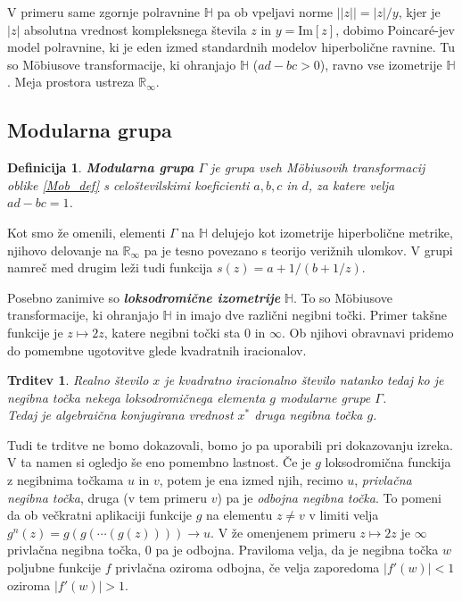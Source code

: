 \documentclass[a4paper,12pt]{article}
\def\R{\mathbb{R}} %
\def\H{\mathbb{H}} %
\newtheorem{trditev}{Trditev}
\newtheorem{definicija}{Definicija}
\begin{document}
V primeru same zgornje polravnine $\H$ pa ob vpeljavi norme $||z|| = |z| / y$, kjer je $|z|$ absolutna vrednost kompleksnega števila $z$ in $y = \text{Im}[z]$, dobimo Poincar\'{e}-jev model polravnine, ki je eden izmed standardnih modelov hiperbolične ravnine. Tu so M\"{o}biusove transformacije, ki ohranjajo $\H$ ($ad - bc > 0$), ravno vse izometrije $\H$. Meja prostora ustreza $\R_{\infty}.$ 

\subsection{Modularna grupa}

\begin{definicija}
    \textbf{Modularna grupa} $\Gamma$ je grupa vseh M\"{o}biusovih transformacij oblike \eqref{Mob_def} s celoštevilskimi koeficienti $a, b, c$ in $d$, za katere velja $ad - bc = 1$.
\end{definicija}

Kot smo že omenili, elementi $\Gamma$ na $\H$ delujejo kot izometrije hiperbolične metrike, njihovo delovanje na $\R_{\infty}$ pa je tesno povezano s teorijo verižnih ulomkov. V grupi namreč med drugim leži tudi funkcija $s(z) = a + 1/(b + 1/z)$.

Posebno zanimive so \textbf{\emph{loksodromične izometrije}} $\H$. To so M\"{o}biusove transformacije, ki ohranjajo $\H$ in imajo dve različni negibni točki. Primer takšne funkcije je $z \mapsto 2z$, katere negibni točki sta $0$ in $\infty$. Ob njihovi obravnavi pridemo do pomembne ugotovitve glede kvadratnih iracionalov.
\begin{trditev}
    Realno število $x$ je kvadratno iracionalno število natanko tedaj ko je negibna točka nekega loksodromičnega elementa $g$ modularne grupe $\Gamma$.\\
    Tedaj je algebraična konjugirana vrednost $x^*$ druga negibna točka $g$.
\end{trditev}

Tudi te trditve ne bomo dokazovali, bomo jo pa uporabili pri dokazovanju izreka. V ta namen si ogledjo še eno pomembno lastnost. Če je $g$ loksodromična funckija z negibnima točkama $u$ in $v$, potem je ena izmed njih, recimo $u$, \emph{privlačna negibna točka}, druga (v tem primeru $v$) pa je \emph{odbojna negibna točka}. To pomeni da ob večkratni aplikaciji funkcije $g$ na elementu $z \neq v$ v limiti velja $g^n(z) = g(g(\cdots(g(z)))) \to u$. V že omenjenem primeru $z \mapsto 2z$ je $\infty$ privlačna negibna točka, $0$ pa je odbojna. Praviloma velja, da je negibna točka $w$ poljubne funkcije $f$ privlačna oziroma odbojna, če velja zaporedoma $|f'(w)| < 1$ oziroma $|f'(w)| > 1$.
\end{document}
